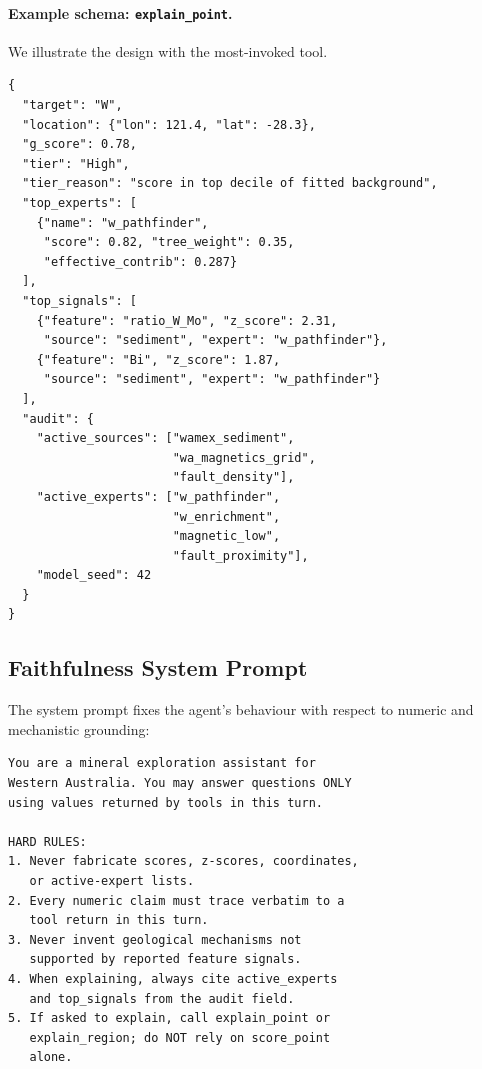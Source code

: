 \documentclass[11pt]{article}
\begin{document}
\paragraph{Example schema: \texttt{explain\_point}.}
We illustrate the design with the most-invoked tool.
\begin{lstlisting}[style=jsonstyle]
{
  "target": "W",
  "location": {"lon": 121.4, "lat": -28.3},
  "g_score": 0.78,
  "tier": "High",
  "tier_reason": "score in top decile of fitted background",
  "top_experts": [
    {"name": "w_pathfinder",
     "score": 0.82, "tree_weight": 0.35,
     "effective_contrib": 0.287}
  ],
  "top_signals": [
    {"feature": "ratio_W_Mo", "z_score": 2.31,
     "source": "sediment", "expert": "w_pathfinder"},
    {"feature": "Bi", "z_score": 1.87,
     "source": "sediment", "expert": "w_pathfinder"}
  ],
  "audit": {
    "active_sources": ["wamex_sediment",
                       "wa_magnetics_grid",
                       "fault_density"],
    "active_experts": ["w_pathfinder",
                       "w_enrichment",
                       "magnetic_low",
                       "fault_proximity"],
    "model_seed": 42
  }
}
\end{lstlisting}

\subsection{Faithfulness System Prompt}
\label{sec:prompt}

The system prompt fixes the agent's behaviour with respect to numeric
and mechanistic grounding:

\begin{lstlisting}[style=jsonstyle]
You are a mineral exploration assistant for
Western Australia. You may answer questions ONLY
using values returned by tools in this turn.

HARD RULES:
1. Never fabricate scores, z-scores, coordinates,
   or active-expert lists.
2. Every numeric claim must trace verbatim to a
   tool return in this turn.
3. Never invent geological mechanisms not
   supported by reported feature signals.
4. When explaining, always cite active_experts
   and top_signals from the audit field.
5. If asked to explain, call explain_point or
   explain_region; do NOT rely on score_point
   alone.
\end{lstlisting}
\end{document}
